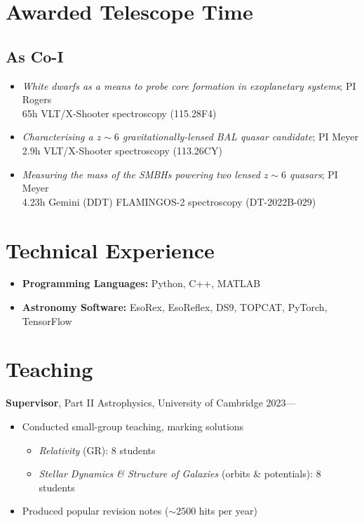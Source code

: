 \documentclass[a4paper,10pt]{article}
\begin{document}

\section*{Awarded Telescope Time}

\subsection*{As Co-I}

\begin{itemize}
    \item \textit{White dwarfs as a means to probe core formation in exoplanetary systems}; PI Rogers\\
    65h VLT/X-Shooter spectroscopy (115.28F4)
    \item \textit{Characterising a $z\sim6$ gravitationally-lensed BAL quasar candidate}; PI Meyer\\
    2.9h VLT/X-Shooter spectroscopy (113.26CY)
    \item \textit{Measuring the mass of the SMBHs powering two lensed $z\sim6$ quasars}; PI Meyer\\
    4.23h Gemini (DDT) FLAMINGOS-2 spectroscopy (DT-2022B-029)
\end{itemize}


\section*{Technical Experience}
\begin{itemize}
    \item \textbf{Programming Languages:} Python, C++, MATLAB
    \item \textbf{Astronomy Software:} EsoRex, EsoReflex, DS9, TOPCAT, PyTorch, TensorFlow
\end{itemize}

\section*{Teaching}
\noindent \textbf{Supervisor}, Part II Astrophysics, University of Cambridge \hfill 2023---
\begin{itemize}
    \item Conducted small-group teaching, marking solutions 
    \begin{itemize}
        \item \textit{Relativity} (GR): 8 students
        \item \textit{Stellar Dynamics \& Structure of Galaxies} (orbits \& potentials): 8 students
    \end{itemize}
    \item Produced popular revision notes ($\sim2500$ hits per year)
\end{itemize}
\end{document}
